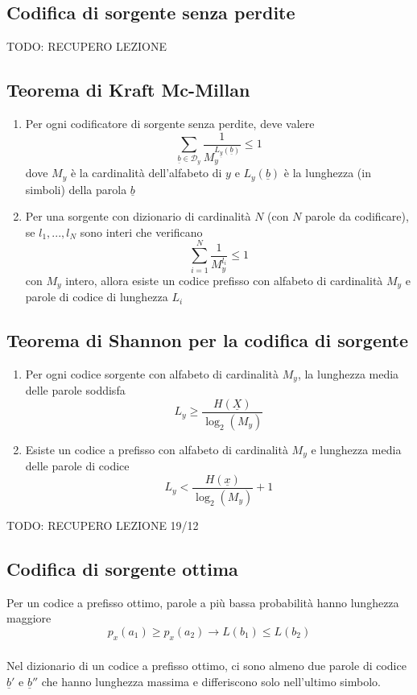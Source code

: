 \documentclass{article}
\begin{document}
\subsection{Codifica di sorgente senza perdite}

TODO: RECUPERO LEZIONE

\subsection{Teorema di Kraft Mc-Millan}
\begin{enumerate}
	\item Per ogni codificatore di sorgente senza perdite, deve valere $$\sum_{\underline{b}\in\mathcal{D}_y}\frac{1}{M_y^{L_{\underline{y}}(\underline{b})}}\leq 1$$ dove $M_y$ è la cardinalità dell'alfabeto di $y$ e $L_y(\underline{b})$ è la lunghezza (in simboli) della parola $\underline{b}$
	\item Per una sorgente con dizionario di cardinalità $N$ (con $N$ parole da codificare), se $l_1,...,l_N$ sono interi che verificano $$\sum_{i=1}^N\frac{1}{M_y^{l_i}}\leq 1$$ con $M_y$ intero, allora esiste un codice prefisso con alfabeto di cardinalità $M_y$ e parole di codice di lunghezza $L_i$
\end{enumerate}

\subsection{Teorema di Shannon per la codifica di sorgente}
\begin{enumerate}
	\item Per ogni codice sorgente con alfabeto di cardinalità $M_y$, la lunghezza media delle parole soddisfa $$L_y\geq \frac{H(\underline{X})}{\log_2(M_y)}$$
	\item Esiste un codice a prefisso con alfabeto di cardinalità $M_y$ e lunghezza media delle parole di codice $$L_y<\frac{H(\underline{x})}{\log_2(M_y)}+1$$
\end{enumerate}
TODO: RECUPERO LEZIONE 19/12

\subsection{Codifica di sorgente ottima}
Per un codice a prefisso ottimo, parole a più bassa probabilità hanno lunghezza maggiore $$p_x(a_1)\geq p_x(a_2)\rightarrow L(b_1)\leq L(b_2)$$
\subsubsection{}
Nel dizionario di un codice a prefisso ottimo, ci sono almeno due parole di codice $\underline{b}'$ e $\underline{b}''$ che hanno lunghezza massima e differiscono solo nell'ultimo simbolo.\\
\end{document}
